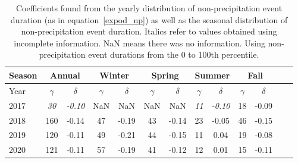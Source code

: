 \begin{table}[htb]
  \begin{center}
    \begin{tabular}{|l|*{11}{c|}r|}
      \hline
      Season    &       \multicolumn{2}{|c|}{Annual}          & \multicolumn{2}{|c|}{Winter}& \multicolumn{2}{|c|}{Spring}  & \multicolumn{2}{|c|}{Summer} &\multicolumn{2}{|c|}{Fall}  \\
      \hline
      Year      & $\gamma $ & $\delta$  & $\gamma $ & $\delta$ & $\gamma $ & $\delta$ & $\gamma $ & $\delta$ & $\gamma $ & $\delta$\\
      \hline
      2017      & \textit{30}  & \textit{-0.10}  & NaN & NaN & NaN & NaN & \textit{11}  & \textit{-0.10}  & 18  & -0.09  \\
      2018      & 160           & -0.14  & 47 & -0.19 & 43 & -0.14 & 23  & -0.05  & 46 & -0.15  \\
      2019      & 120           & -0.11  & 49 & -0.21 & 44 & -0.15 & 11 & 0.04 & 19 & -0.08   \\
      2020      & 121           & -0.11  & 57 & -0.19 & 41 & -0.12 & 12  & 0.01  & 15 & -0.11 \\
      \hline
    \end{tabular}
  \end{center}
  \caption[Year comparison of coefficients for non-precipitation
    events for 0 to 100th percentile] {\label{thirdtable_100}Coefficients found from the yearly
    distribution of non-precipitation event duration (as in
    equation~\ref{expod_np}) as well as the seasonal distribution of
    non-precipitation event duration. Italics refer to values obtained
    using incomplete information. NaN means there was no
    information. Using non-precipitation event durations from the 0 to 100th percentile.}
\end{table}
